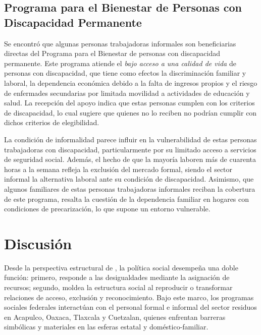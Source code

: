 \documentclass[
  spanish,
  11pt,
  a4paper,
]{scrbook}
\begin{document}
\subsection*{Programa para el Bienestar de Personas con Discapacidad
Permanente}\label{programa-para-el-bienestar-de-personas-con-discapacidad-permanente}

Se encontró que algunas personas trabajadoras informales son
beneficiarias directas del Programa para el Bienestar de personas con
discapacidad permanente. Este programa atiende el \emph{bajo acceso a
una calidad de vida} de personas con discapacidad, que tiene como
efectos la discriminación familiar y laboral, la dependencia económica
debido a la falta de ingresos propios y el riesgo de enfermades
secundarias por limitada movilidad a actividades de educación y salud.
La recepción del apoyo indica que estas personas cumplen con los
criterios de discapacidad, lo cual sugiere que quienes no lo reciben no
podrían cumplir con dichos criterios de elegibilidad.

La condición de informalidad parece influir en la vulnerabilidad de
estas personas trabajadoras con discapacidad, particularmente por su
limitado acceso a servicios de seguridad social. Además, el hecho de que
la mayoría laboren más de cuarenta horas a la semana refleja la
exclusión del mercado formal, siendo el sector informal la alternativa
laboral ante su condición de discapacidad. Asimismo, que algunos
familiares de estas personas trabajadoras informales reciban la
cobertura de este programa, resalta la cuestión de la dependencia
familiar en hogares con condiciones de precarización, lo que supone un
entorno vulnerable.

\section*{Discusión}\label{discusiuxf3n}


Desde la perspectiva estructural de \textcite{Adelantado1998}, la
política social desempeña una doble función: primero, responde a las
desigualdades mediante la asignación de recursos; segundo, moldea la
estructura social al reproducir o transformar relaciones de acceso,
exclusión y reconocimiento. Bajo este marco, los programas sociales
federales interactúan con el personal formal e informal del sector
residuos en Acapulco, Oaxaca, Tlaxcala y Cuetzalan, quienes enfrentan
barreras simbólicas y materiales en las esferas estatal y
doméstico-familiar.
\end{document}
